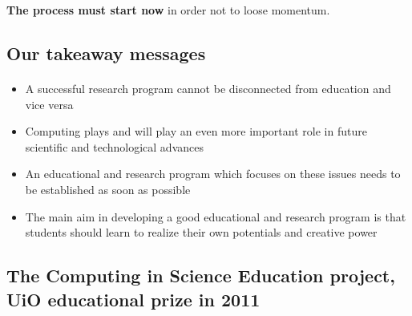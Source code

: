 \documentclass[%
twoside,                 %
final,                   %
10pt]{article}
\begin{document}
\noindent



\textbf{The process must start now} in order not to loose momentum.


\subsection*{Our takeaway messages}

\paragraph{}
\begin{itemize}
\item A successful research program cannot be disconnected from education and vice versa

\item Computing plays and will play an even more important role in future scientific and technological advances

\item An educational and research program which focuses on these issues needs to be established as soon as possible

\item The main aim in developing a good educational and research program is  that students should learn to realize their own potentials and creative power
\end{itemize}

\noindent




\subsection*{The Computing in Science Education project, UiO educational prize in 2011}

\end{document}
